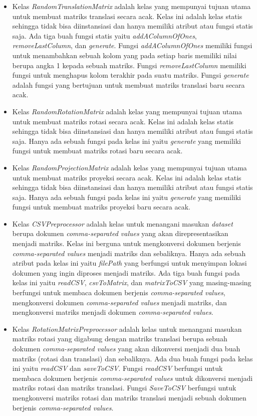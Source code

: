 \begin{itemize}
    \item Kelas \textit{RandomTranslationMatrix} adalah kelas yang mempunyai tujuan utama untuk membuat matriks translasi secara acak. Kelas ini adalah kelas statis sehingga tidak bisa diinstansiasi dan hanya memiliki atribut atau fungsi statis saja. Ada tiga buah fungsi statis yaitu \textit{addAColumnOfOnes}, \textit{removeLastColumn}, dan \textit{generate}. Fungsi \textit{addAColumnOfOnes} memiliki fungsi untuk menambahkan sebuah kolom yang pada setiap baris memiliki nilai berupa angka 1 kepada sebuah matriks. Fungsi \textit{removeLastColumn} memiliki fungsi untuk menghapus kolom terakhir pada suatu matriks. Fungsi \textit{generate} adalah fungsi yang bertujuan untuk membuat matriks translasi baru secara acak.
    \item Kelas \textit{RandomRotationMatrix} adalah kelas yang mempunyai tujuan utama untuk membuat matriks rotasi secara acak. Kelas ini adalah kelas statis sehingga tidak bisa diinstansiasi dan hanya memiliki atribut atau fungsi statis saja. Hanya ada sebuah fungsi pada kelas ini yaitu \textit{generate} yang memiliki fungsi untuk membuat matriks rotasi baru secara acak.
    \item Kelas \textit{RandomProjectionMatrix} adalah kelas yang mempunyai tujuan utama untuk membuat matriks proyeksi secara acak. Kelas ini adalah kelas statis sehingga tidak bisa diinstansiasi dan hanya memiliki atribut atau fungsi statis saja. Hanya ada sebuah fungsi pada kelas ini yaitu \textit{generate} yang memiliki fungsi untuk membuat matriks proyeksi baru secara acak.
    \item Kelas \textit{CSVPreprocessor} adalah kelas untuk menangani masukan \textit{dataset} berupa dokumen \textit{comma-separated values} yang akan direpresentasikan menjadi matriks. Kelas ini berguna untuk mengkonversi dokumen berjenis \textit{comma-separated values} menjadi matriks dan sebaliknya. Hanya ada sebuah atribut pada kelas ini yaitu \textit{filePath} yang berfungsi untuk menyimpan lokasi dokumen yang ingin diproses menjadi matriks. Ada tiga buah fungsi pada kelas ini yaitu \textit{readCSV}, \textit{csvToMatrix}, dan \textit{matrixToCSV} yang masing-masing berfungsi untuk membaca dokumen berjenis \textit{comma-separated values}, mengkonversi dokumen \textit{comma-separated values} menjadi matriks, dan mengkonversi matriks menjadi dokumen \textit{comma-separated values}.
    \item Kelas \textit{RotationMatrixPreprocessor} adalah kelas untuk menangani masukan matriks rotasi yang digabung dengan matriks translasi berupa sebuah dokumen \textit{comma-separated values} yang akan dikonversi menjadi dua buah matriks (rotasi dan translasi) dan sebaliknya. Ada dua buah fungsi pada kelas ini yaitu \textit{readCSV} dan \textit{saveToCSV}. Fungsi \textit{readCSV} berfungsi untuk membaca dokumen berjenis \textit{comma-separated values} untuk dikonversi menjadi matriks rotasi dan matriks translasi. Fungsi \textit{SaveToCSV} berfungsi untuk mengkonversi matriks rotasi dan matriks translasi menjadi sebuah dokumen berjenis \textit{comma-separated values}.

\end{itemize}
